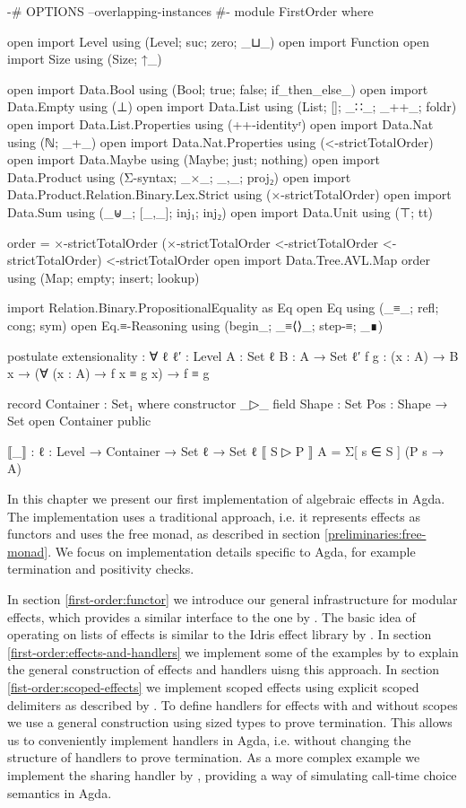 \begin{code}[hide]
{-# OPTIONS --overlapping-instances #-}
module FirstOrder where

open import Level using (Level; suc; zero; _⊔_)
open import Function
open import Size using (Size; ↑_)

open import Data.Bool using (Bool; true; false; if_then_else_)
open import Data.Empty using (⊥)
open import Data.List using (List; []; _∷_; _++_; foldr)
open import Data.List.Properties using (++-identityʳ)
open import Data.Nat using (ℕ; _+_)
open import Data.Nat.Properties using (<-strictTotalOrder)
open import Data.Maybe using (Maybe; just; nothing)
open import Data.Product using (Σ-syntax; _×_; _,_; proj₂)
open import Data.Product.Relation.Binary.Lex.Strict using (×-strictTotalOrder)
open import Data.Sum using (_⊎_; [_,_]; inj₁; inj₂)
open import Data.Unit using (⊤; tt)

order = ×-strictTotalOrder (×-strictTotalOrder <-strictTotalOrder <-strictTotalOrder) <-strictTotalOrder
open import Data.Tree.AVL.Map order using (Map; empty; insert; lookup)

import Relation.Binary.PropositionalEquality as Eq
open Eq using (_≡_; refl; cong; sym)
open Eq.≡-Reasoning using (begin_; _≡⟨⟩_; step-≡; _∎)

postulate
  extensionality : ∀ {ℓ ℓ′ : Level} {A : Set ℓ} {B : A → Set ℓ′} {f g : (x : A) → B x}
      → (∀ (x : A) → f x ≡ g x) → f ≡ g

record Container : Set₁ where
  constructor _▷_
  field
    Shape : Set
    Pos : Shape → Set
open Container public

⟦_⟧ : {ℓ : Level} → Container → Set ℓ → Set ℓ
⟦ S ▷ P ⟧ A = Σ[ s ∈ S ] (P s → A)
\end{code}

In this chapter we present our first implementation of algebraic effects in Agda.
The implementation uses a traditional approach, i.e. it represents effects as
functors and uses the free monad, as described in section
\ref{preliminaries:free-monad}.
We focus on implementation details specific to Agda, for example termination and
positivity checks.

In section \ref{first-order:functor} we introduce our general infrastructure for
modular effects, which provides a similar interface to the one by
\textcite{DBLP:conf/haskell/WuSH14}.
The basic idea of operating on lists of effects is similar to the Idris effect
library by \textcite{DBLP:conf/icfp/Brady13}.
In section \ref{first-order:effects-and-handlers} we implement some of the
examples by \textcite{DBLP:conf/haskell/WuSH14} to explain the general
construction of effects and handlers uisng this approach.
In section \ref{fist-order:scoped-effects} we implement scoped effects using
explicit scoped delimiters as described by \textcite{DBLP:conf/haskell/WuSH14}.
To define handlers for effects with and without scopes we use a general
construction using sized types to prove termination.
This allows us to conveniently implement handlers in Agda, i.e. without changing
the structure of handlers to prove termination.
As a more complex example we implement the sharing handler by
\textcite{bunkenburg2019modeling}, providing a way of simulating call-time
choice semantics in Agda.


